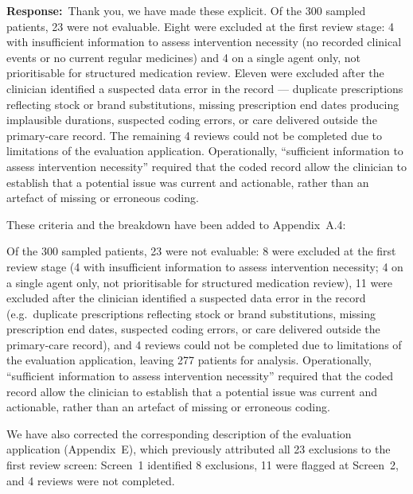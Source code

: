 \documentclass[11pt,a4paper]{article}
\newcommand{\response}{\noindent\textbf{Response:}\ }
\begin{document}
\response Thank you, we have made these explicit. Of the 300 sampled patients, 23 were not evaluable. Eight were excluded at the first review stage: 4 with insufficient information to assess intervention necessity (no recorded clinical events or no current regular medicines) and 4 on a single agent only, not prioritisable for structured medication review. Eleven were excluded after the clinician identified a suspected data error in the record --- duplicate prescriptions reflecting stock or brand substitutions, missing prescription end dates producing implausible durations, suspected coding errors, or care delivered outside the primary-care record. The remaining 4 reviews could not be completed due to limitations of the evaluation application. Operationally, ``sufficient information to assess intervention necessity'' required that the coded record allow the clinician to establish that a potential issue was current and actionable, rather than an artefact of missing or erroneous coding.

These criteria and the breakdown have been added to Appendix~A.4:

\begin{manuscriptchange}
Of the 300 sampled patients, 23 were not evaluable: 8 were excluded at the first review stage (4 with insufficient information to assess intervention necessity; 4 on a single agent only, not prioritisable for structured medication review), 11 were excluded after the clinician identified a suspected data error in the record (e.g.\ duplicate prescriptions reflecting stock or brand substitutions, missing prescription end dates, suspected coding errors, or care delivered outside the primary-care record), and 4 reviews could not be completed due to limitations of the evaluation application, leaving 277 patients for analysis. Operationally, ``sufficient information to assess intervention necessity'' required that the coded record allow the clinician to establish that a potential issue was current and actionable, rather than an artefact of missing or erroneous coding.
\end{manuscriptchange}

We have also corrected the corresponding description of the evaluation application (Appendix~E), which previously attributed all 23 exclusions to the first review screen: Screen~1 identified 8 exclusions, 11 were flagged at Screen~2, and 4 reviews were not completed.

\end{document}
